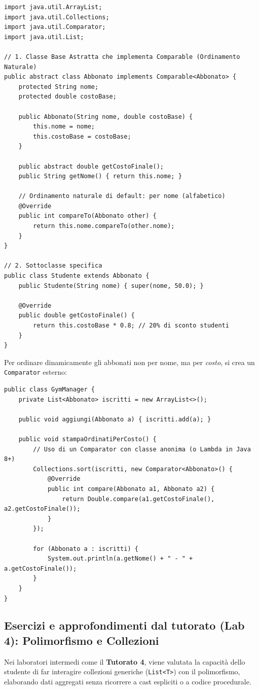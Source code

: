 \documentclass[12pt, a4paper]{article}
\begin{document}
\begin{verbatim}
import java.util.ArrayList;
import java.util.Collections;
import java.util.Comparator;
import java.util.List;

// 1. Classe Base Astratta che implementa Comparable (Ordinamento Naturale)
public abstract class Abbonato implements Comparable<Abbonato> {
    protected String nome;
    protected double costoBase;

    public Abbonato(String nome, double costoBase) {
        this.nome = nome;
        this.costoBase = costoBase;
    }

    public abstract double getCostoFinale();
    public String getNome() { return this.nome; }

    // Ordinamento naturale di default: per nome (alfabetico)
    @Override
    public int compareTo(Abbonato other) {
        return this.nome.compareTo(other.nome);
    }
}

// 2. Sottoclasse specifica
public class Studente extends Abbonato {
    public Studente(String nome) { super(nome, 50.0); }

    @Override
    public double getCostoFinale() {
        return this.costoBase * 0.8; // 20% di sconto studenti
    }
}
\end{verbatim}

\newpage

Per ordinare dinamicamente gli abbonati non per nome, ma per \textit{costo}, si crea un \texttt{Comparator} esterno:

\begin{verbatim}
public class GymManager {
    private List<Abbonato> iscritti = new ArrayList<>();

    public void aggiungi(Abbonato a) { iscritti.add(a); }

    public void stampaOrdinatiPerCosto() {
        // Uso di un Comparator con classe anonima (o Lambda in Java 8+)
        Collections.sort(iscritti, new Comparator<Abbonato>() {
            @Override
            public int compare(Abbonato a1, Abbonato a2) {
                return Double.compare(a1.getCostoFinale(), a2.getCostoFinale());
            }
        });

        for (Abbonato a : iscritti) {
            System.out.println(a.getNome() + " - " + a.getCostoFinale());
        }
    }
}
\end{verbatim}
\subsection{Esercizi e approfondimenti dal tutorato (Lab 4): Polimorfismo e Collezioni}
Nei laboratori intermedi come il \textbf{Tutorato 4}, viene valutata la capacità dello studente di far interagire collezioni generiche (\texttt{List<T>}) con il polimorfismo, elaborando dati aggregati senza ricorrere a cast espliciti o a codice procedurale.
\end{document}
